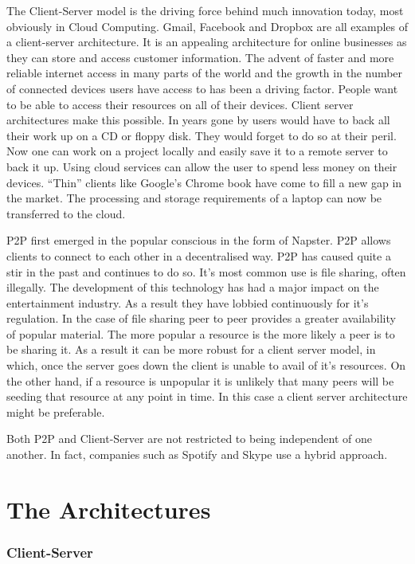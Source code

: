 \documentclass[11pt]{amsart}
\begin{document}
The Client-Server model is the driving force behind much innovation today, most obviously in Cloud Computing. Gmail, Facebook and Dropbox are all examples of a client-server architecture. It is an appealing architecture for online businesses as they can store and access customer information. The advent of faster and more reliable internet access in many parts of the world and the growth in the number of connected devices users have access to has been a driving factor. People want to be able to access their resources on all of their devices. Client server architectures make this possible. In years gone by users would have to back all their work up on a CD or floppy disk. They would forget to do so at their peril. Now one can work on a project locally and easily save it to a remote server to back it up. 
Using cloud services can allow the user to spend less money on their devices. ``Thin'' clients like Google's Chrome book have come to fill a new gap in the market. The processing and storage requirements of a laptop can now be transferred to the cloud.

P2P first emerged in the popular conscious in the form of Napster. P2P allows clients to connect to each other in a decentralised way.
P2P has caused quite a stir in the past and continues to do so. It's most common use is file sharing, often illegally. The development of this technology has had a major impact on the entertainment industry. As a result they have lobbied continuously for it's regulation. 
In the case of file sharing peer to peer provides a greater availability of popular material. The more popular a resource is the more likely a peer is to be sharing it. As a result it can be more robust for a client server model, in which, once the server goes down the client is unable to avail of it's resources. On the other hand, if a resource is unpopular it is unlikely that many peers will be seeding that resource at any point in time. In this case a client server architecture might be preferable.


Both P2P and Client-Server are not restricted to being independent of one another. In fact, companies such as Spotify and Skype use a hybrid approach.

\part{The Architectures}
\section{Client-Server}
\end{document}
